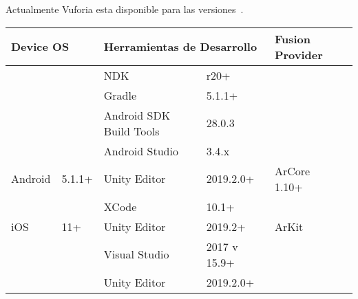 Actualmente Vuforia esta disponible para las versiones~\cite{vuforia_supported_versions}.
\begin{table}[]
	\begin{tabular}{|l|l|l|l|l|l|}
		\hline
		\multicolumn{2}{|l|}{Device OS}                       & \multicolumn{2}{l|}{Herramientas de Desarrollo}                                             & \multicolumn{2}{l|}{Fusion Provider}                \\ \hline
		&                          & NDK                                            & r20+                                       &                                &                    \\ \cline{3-4}
		&                          & \cellcolor[HTML]{EFEFEF}Gradle                 & \cellcolor[HTML]{EFEFEF}5.1.1+             &                                &                    \\ \cline{3-4}
		&                          & Android SDK Build Tools                        & 28.0.3                                     &                                &                    \\ \cline{3-4}
		&                          & \cellcolor[HTML]{EFEFEF}Android Studio         & \cellcolor[HTML]{EFEFEF}3.4.x              &                                &                    \\ \cline{3-4}
		\multirow{-5}{*}{Android}  & \multirow{-5}{*}{5.1.1+} & Unity Editor                                   & 2019.2.0+                                  & \multirow{-5}{*}{ArCore 1.10+} & \multirow{-5}{*}{} \\ \hline
		&                          & \cellcolor[HTML]{EFEFEF}XCode                  & \cellcolor[HTML]{EFEFEF}10.1+              & \multicolumn{2}{l|}{}                               \\ \cline{3-4}
		\multirow{-2}{*}{iOS}      & \multirow{-2}{*}{11+}    & Unity Editor                                   & 2019.2+                                    & \multicolumn{2}{l|}{\multirow{-2}{*}{ArKit}}        \\ \hline
		&                          & \cellcolor[HTML]{EFEFEF}Visual Studio          & \cellcolor[HTML]{EFEFEF}2017 v 15.9+ & \multicolumn{2}{l|}{}                               \\ \cline{3-4}
		&                          & Unity Editor                                   & 2019.2.0+                                  & \multicolumn{2}{l|}{}                               \\ \cline{3-4}

\end{tabular}
\end{table}
